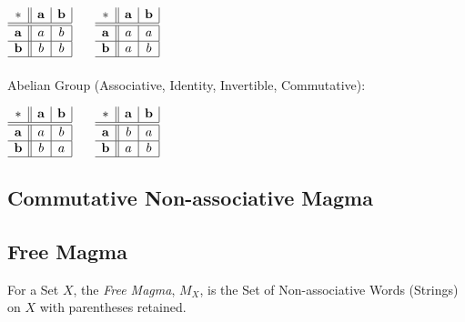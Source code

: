 $\begin{array}{c||c|c|}
  * & \mathbf{a} & \mathbf{b} \\ \hline \hline
  \mathbf{a} & a & b \\ \hline
  \mathbf{b} & b & b \\ \hline
\end{array}$ $\quad$ $\begin{array}{c||c|c|}
  * & \mathbf{a} & \mathbf{b} \\ \hline \hline
  \mathbf{a} & a & a \\ \hline
  \mathbf{b} & a & b \\ \hline
\end{array}$
\\ \\
Abelian Group (Associative, Identity, Invertible, Commutative):

$\begin{array}{c||c|c|}
  * & \mathbf{a} & \mathbf{b} \\ \hline \hline
  \mathbf{a} & a & b \\ \hline
  \mathbf{b} & b & a \\ \hline
\end{array}$ $\quad$ $\begin{array}{c||c|c|}
  * & \mathbf{a} & \mathbf{b} \\ \hline \hline
  \mathbf{a} & b & a \\ \hline
  \mathbf{b} & a & b \\ \hline
\end{array}$



\subsection{Commutative Non-associative Magma}
\label{sec:commutative_magma}

\subsection{Free Magma}\label{sec:free_magma}

For a Set $X$, the \emph{Free Magma}, $M_X$, is the Set of
Non-associative Words (Strings) on $X$ with parentheses retained.

